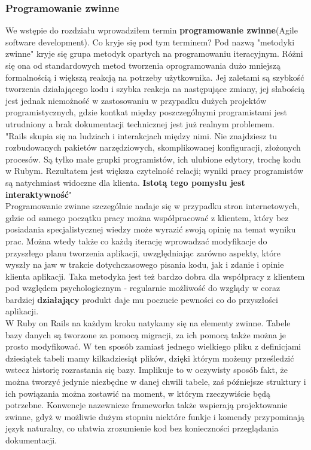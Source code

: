 \documentclass[12pt,leqno]{article}
\begin{document}
\subsubsection{Programowanie zwinne}
We wstępie do rozdziału wprowadziłem termin {\bf programowanie zwinne}(Agile software development). Co kryje się pod tym terminem? Pod nazwą "metodyki zwinne" kryje się grupa metodyk opartych na programowaniu iteracyjnym. Różni się ona od standardowych metod tworzenia oprogramowania dużo mniejszą formalnością i większą reakcją na potrzeby użytkownika. Jej zaletami są szybkość tworzenia działającego kodu i szybka reakcja na następujące zmiany, jej słabością jest jednak niemożność w zastosowaniu w przypadku dużych projektów programistycznych, gdzie kontkat między poszczególnymi programistami jest utrudniony a brak dokumentacji technicznej jest już realnym problemem. \\
"Rails skupia się na ludziach i interakcjach między nimi. Nie znajdziesz tu rozbudowanych pakietów narzędziowych, skomplikowanej konfiguracji, złożonych procesów. Są tylko małe grupki programistów, ich ulubione edytory, trochę kodu w Rubym. Rezultatem jest większa czytelność relacji; wyniki pracy programistów są natychmiast widoczne dla klienta. {\bf Istotą tego pomysłu jest interaktywność}"\cite{1}\\
Programowanie zwinne szczególnie nadaje się w przypadku stron internetowych, gdzie od samego początku pracy można współpracować z klientem, który bez posiadania specjalistycznej wiedzy może wyrazić swoją opinię na temat wyniku prac. Można wtedy także co każdą iterację wprowadzać modyfikacje do przyszłego planu tworzenia aplikacji, uwzględniając zarówno aspekty, które wyszły na jaw w trakcie dotychczasowego pisania kodu, jak i zdanie i opinie klienta aplikacji. Taka metodyka jest też bardzo dobra dla współpracy z klientem pod względem psychologicznym - regularnie możliwość do wzglądy w coraz bardziej {\bf działający} produkt daje mu poczucie pewności co do przyszłości aplikacji.\\
W Ruby on Rails na każdym kroku natykamy się na elementy zwinne. Tabele bazy danych są tworzone za pomocą migracji, za ich pomocą także można je prosto modyfikować. W ten sposób zamiast jednego wielkiego pliku z definicjami dziesiątek tabeli mamy kilkadziesiąt plików, dzięki którym możemy prześledzić wstecz historię rozrastania się bazy. Implikuje to w oczywisty sposób fakt, że można tworzyć jedynie niezbędne w danej chwili tabele, zaś późniejsze struktury i ich powiązania można zostawić na moment, w którym rzeczywiście będą potrzebne. Konwencje nazewnicze frameworka także wspierają projektowanie zwinne, gdyż w możliwie dużym stopniu niektóre funkje i komendy przypominają język naturalny, co ułatwia zrozumienie kod bez konieczności przeglądania dokumentacji. 
\end{document}
